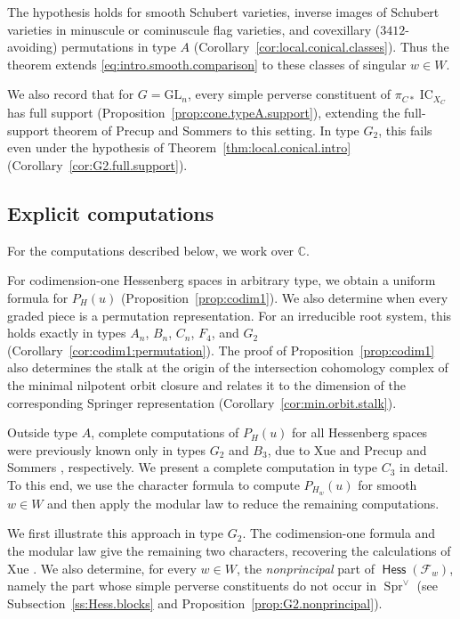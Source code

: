 \documentclass[11pt]{amsart}
\numberwithin{equation}{section}
\theoremstyle{definition}
\DeclareMathOperator{\IC}{\mathrm{IC}}
\DeclareMathOperator{\Hess}{\mathsf{Hess}}
\def\C{\mathbb{C}}
\DeclareMathOperator{\Spr}{\mathrm{Spr}}
\begin{document}
The hypothesis holds for smooth Schubert varieties, inverse images of Schubert varieties in minuscule or cominuscule flag varieties, and covexillary ($3412$-avoiding) permutations in type $A$ (Corollary~\ref{cor:local.conical.classes}).
Thus the theorem extends \eqref{eq:intro.smooth.comparison} to these classes of singular $w\in W$.

\medskip

We also record that for $G=\mathrm{GL}_n$, every simple perverse constituent of $\pi_{C*}\IC_{X_C}$ has full support (Proposition~\ref{prop:cone.typeA.support}), extending the full-support theorem of Precup and Sommers to this setting. %
In type $G_2$, this fails even under the hypothesis of Theorem~\ref{thm:local.conical.intro} (Corollary~\ref{cor:G2.full.support}).








\subsection{Explicit computations}
For the computations described below, we work over $\C$.

For codimension-one Hessenberg spaces in arbitrary type, we obtain a uniform formula for $P_H(u)$ (Proposition~\ref{prop:codim1}).
We also determine when every graded piece is a permutation representation.
For an irreducible root system, this holds exactly in types $A_n$, $B_n$, $C_n$, $F_4$, and $G_2$ (Corollary~\ref{cor:codim1:permutation}).
The proof of Proposition~\ref{prop:codim1} also determines the stalk at the origin of the intersection cohomology complex of the minimal nilpotent orbit closure and relates it to the dimension of the corresponding Springer representation (Corollary~\ref{cor:min.orbit.stalk}).

Outside type $A$, complete computations of $P_H(u)$ for all Hessenberg spaces were previously known only in types $G_2$ and $B_3$, due to Xue \cite[Table~5]{xue} and Precup and Sommers \cite[Section~8]{PS}, respectively.
We present a complete computation in type $C_3$ in detail.
To this end, we use the character formula to compute $P_{H_w}(u)$ for smooth $w\in W$ and then apply the modular law \cite{PS} to reduce the remaining computations.

We first illustrate this approach in type $G_2$.
The codimension-one formula and the modular law give the remaining two characters, recovering the calculations of Xue \cite[Table~5]{xue}.
We also determine, for every $w\in W$, the \emph{nonprincipal} part of $\Hess(\mathcal F_w)$, namely the part whose simple perverse constituents do not occur in $\Spr^\vee$ (see Subsection~\ref{ss:Hess.blocks} and Proposition~\ref{prop:G2.nonprincipal}).
\end{document}
